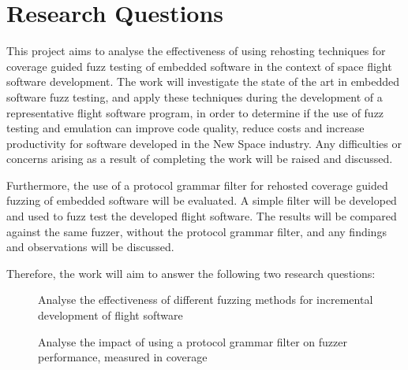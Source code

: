 \documentclass[../report.tex]{subfiles}
\begin{document}



\section{Research Questions} \label{sec:rq}
This project aims to analyse the effectiveness of using rehosting techniques
for coverage guided fuzz testing of embedded software in the context of space
flight software development. The work will investigate the state of the art in
embedded software fuzz testing, and apply these techniques during the
development of a representative flight software program, in order to determine
if the use of fuzz testing and emulation can improve code quality, reduce costs
and increase productivity for software developed in the New Space industry. Any
difficulties or concerns arising as a result of completing the work will be
raised and discussed.

Furthermore, the use of a protocol grammar filter for rehosted coverage guided
fuzzing of embedded software will be evaluated. A simple filter will be
developed and used to fuzz test the developed flight software. The results will
be compared against the same fuzzer, without the protocol grammar filter, and
any findings and observations will be discussed.

Therefore, the work will aim to answer the following two research questions:

\begin{description}
    \item[]Analyse the effectiveness of different fuzzing methods for incremental development of flight software
    \item[]Analyse the impact of using a protocol grammar filter on fuzzer performance, measured in coverage

\end{description}
\end{document}
